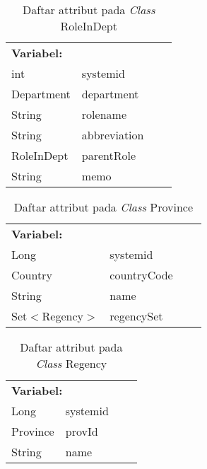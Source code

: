 \begin{table}[H]
	\caption{Daftar attribut pada \textit{Class} RoleInDept}
	\centering
	\small
	\begin{adjustbox}{width=1\textwidth}	
		\begin{tabular}{|p{5cm} p{3.1cm} p{2cm} p{2.1cm}|}
			\hline
			\multicolumn{2}{|l}{\textbf{Variabel:}}&\multicolumn{2}{l|}{\textbf{}}\\
			int&systemid&&\\
			Department&department&&\\
			String&rolename&&\\
			String&abbreviation&&\\
			RoleInDept&parentRole&&\\
			String&memo&&\\
			\hline
		\end{tabular}
	\end{adjustbox}
\end{table}
\begin{table}[H]
	\caption{Daftar attribut pada \textit{Class} Province}
	\centering
	\small
	\begin{adjustbox}{width=1\textwidth}	
		\begin{tabular}{|p{5cm} p{3.1cm} p{2cm} p{2.1cm}|}
			\hline
			\multicolumn{2}{|l}{\textbf{Variabel:}}&\multicolumn{2}{l|}{\textbf{}}\\
			Long&systemid&&\\
			Country&countryCode&&\\
			String&name&&\\
			Set$<$Regency$>$&regencySet&&\\
			\hline
		\end{tabular}
	\end{adjustbox}
\end{table}
\begin{table}[H]
	\caption{Daftar attribut pada \textit{Class} Regency}
	\centering
	\small
	\begin{adjustbox}{width=1\textwidth}	
		\begin{tabular}{|p{5cm} p{3.1cm} p{2cm} p{2.1cm}|}
			\hline
			\multicolumn{2}{|l}{\textbf{Variabel:}}&\multicolumn{2}{l|}{\textbf{}}\\
			Long&systemid&&\\
			Province&provId&&\\
			String&name&&\\
			\hline
		\end{tabular}
	\end{adjustbox}
\end{table}

